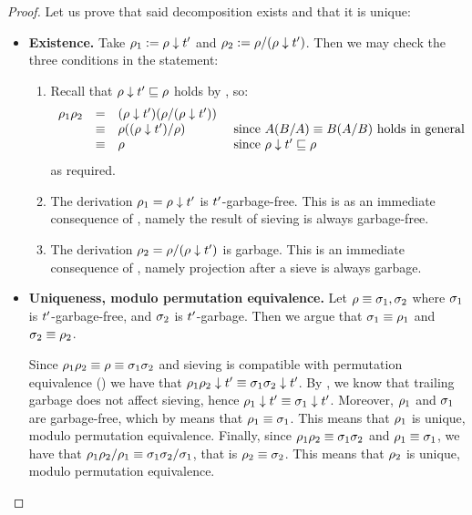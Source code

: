 \begin{proof}
Let us prove that said decomposition exists and that it is unique:
\begin{itemize}
\item {\bf Existence.}
  Take $\rho_1 := \rho \downarrow t'$ and $\rho_2 := \rho/(\rho \downarrow t')$.
  Then we may check the three conditions in the statement:
  \begin{enumerate}
  \item
    Recall that $\rho \downarrow t' \sqsubseteq \rho$ holds by , so:
    \[
      \begin{array}{rcll}
      \rho_1\rho_2
      & = & (\rho \downarrow t')(\rho/(\rho \downarrow t')) \\
      & \equiv & \rho((\rho \downarrow t')/\rho) & \text{ since $A(B/A) \equiv B(A/B)$ holds in general} \\
      & \equiv & \rho                                & \text{ since $\rho \downarrow t' \sqsubseteq \rho$}
      \end{array}
    \]
    as required.
  \item
    The derivation $\rho_1 = \rho \downarrow t'$
    is $t'$-garbage-free.
    This is as an immediate consequence of ,
    namely the result of sieving is always garbage-free.
  \item
    The derivation $\rho_2 = \rho/(\rho \downarrow t')$ is garbage.
    This is an immediate consequence of ,
    namely projection after a sieve is always garbage.
  \end{enumerate}
\item {\bf Uniqueness, modulo permutation equivalence.}
  Let $\rho \equiv \sigma_1,\sigma_2$
  where $\sigma_1$ is $t'$-garbage-free,
  and $\sigma_2$ is $t'$-garbage.
  Then we argue that $\sigma_1 \equiv \rho_1$ and $\sigma_2 \equiv \rho_2$.

  Since $\rho_1\rho_2 \equiv \rho \equiv \sigma_1\sigma_2$
  and sieving is compatible with permutation equivalence ()
  we have that $\rho_1\rho_2 \downarrow t' \equiv \sigma_1\sigma_2 \downarrow t'$.
  By , we know that trailing garbage does not affect sieving,
  hence $\rho_1 \downarrow t' \equiv \sigma_1 \downarrow t'$.
  Moreover, $\rho_1$ and $\sigma_1$ are garbage-free, which
  by  means
  that $\rho_1 \equiv \sigma_1$.
  This means that $\rho_1$ is unique, modulo permutation equivalence.
  Finally, since $\rho_1\rho_2 \equiv \sigma_1\sigma_2$ and $\rho_1 \equiv \sigma_1$,
  we have that $\rho_1\rho_2/\rho_1 \equiv \sigma_1\sigma_2/\sigma_1$,
  that is $\rho_2 \equiv \sigma_2$.
  This means that $\rho_2$ is unique, modulo permutation equivalence.
\end{itemize}
\end{proof}

